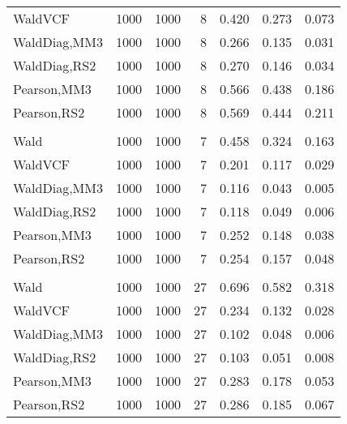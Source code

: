 \documentclass[
]{article}
\begin{document}
\begin{table}[H]
{\begin{tabular}[t]{lrrrrrr}
\hspace{1em}WaldVCF & 1000 & 1000 & 8 & 0.420 & 0.273 & 0.073\\
\hspace{1em}WaldDiag,MM3 & 1000 & 1000 & 8 & 0.266 & 0.135 & 0.031\\
\hspace{1em}WaldDiag,RS2 & 1000 & 1000 & 8 & 0.270 & 0.146 & 0.034\\
\hspace{1em}Pearson,MM3 & 1000 & 1000 & 8 & 0.566 & 0.438 & 0.186\\
\hspace{1em}Pearson,RS2 & 1000 & 1000 & 8 & 0.569 & 0.444 & 0.211\\
\addlinespace[0.3em]
\multicolumn{7}{l}{\textbf{2F 10V}}\\
\hspace{1em}Wald & 1000 & 1000 & 7 & 0.458 & 0.324 & 0.163\\
\hspace{1em}WaldVCF & 1000 & 1000 & 7 & 0.201 & 0.117 & 0.029\\
\hspace{1em}WaldDiag,MM3 & 1000 & 1000 & 7 & 0.116 & 0.043 & 0.005\\
\hspace{1em}WaldDiag,RS2 & 1000 & 1000 & 7 & 0.118 & 0.049 & 0.006\\
\hspace{1em}Pearson,MM3 & 1000 & 1000 & 7 & 0.252 & 0.148 & 0.038\\
\hspace{1em}Pearson,RS2 & 1000 & 1000 & 7 & 0.254 & 0.157 & 0.048\\
\addlinespace[0.3em]
\multicolumn{7}{l}{\textbf{3F 15V}}\\
\hspace{1em}Wald & 1000 & 1000 & 27 & 0.696 & 0.582 & 0.318\\
\hspace{1em}WaldVCF & 1000 & 1000 & 27 & 0.234 & 0.132 & 0.028\\
\hspace{1em}WaldDiag,MM3 & 1000 & 1000 & 27 & 0.102 & 0.048 & 0.006\\
\hspace{1em}WaldDiag,RS2 & 1000 & 1000 & 27 & 0.103 & 0.051 & 0.008\\
\hspace{1em}Pearson,MM3 & 1000 & 1000 & 27 & 0.283 & 0.178 & 0.053\\
\hspace{1em}Pearson,RS2 & 1000 & 1000 & 27 & 0.286 & 0.185 & 0.067\\
\bottomrule
\end{tabular}}
\endgroup{}
\end{table}
\end{document}
